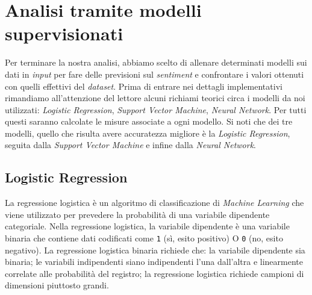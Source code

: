\chapter{Analisi tramite modelli supervisionati}
		Per terminare la nostra analisi, abbiamo scelto di allenare determinati modelli sui dati in \textit{input} per fare delle previsioni sul \textit{sentiment} e confrontare i valori ottenuti con quelli effettivi del \textit{dataset}. Prima di entrare nei dettagli implementativi rimandiamo all'attenzione del lettore alcuni richiami teorici circa i modelli da noi utilizzati: \textit{Logistic Regression}, \textit{Support Vector Machine}, \textit{Neural Network}. Per tutti questi saranno calcolate le misure associate a ogni modello. Si noti che dei tre modelli, quello che risulta avere accuratezza migliore è la \textit{Logistic Regression}, seguita dalla \textit{Support Vector Machine} e  infine dalla \textit{Neural Network}.
		
			
		\section{Logistic Regression}
			La regressione logistica è un algoritmo di classificazione di \textit{Machine Learning} che viene utilizzato per prevedere la probabilità di una variabile dipendente categoriale. Nella regressione logistica, la variabile dipendente è una variabile binaria che contiene dati codificati come \verb|1| (sì, esito positivo) O \verb|0| (no, esito negativo). La regressione logistica binaria richiede che: la variabile dipendente sia binaria; le variabili indipendenti siano indipendenti l'una dall'altra e linearmente correlate alle probabilità del registro; la regressione logistica richiede campioni di dimensioni piuttosto grandi.
			
